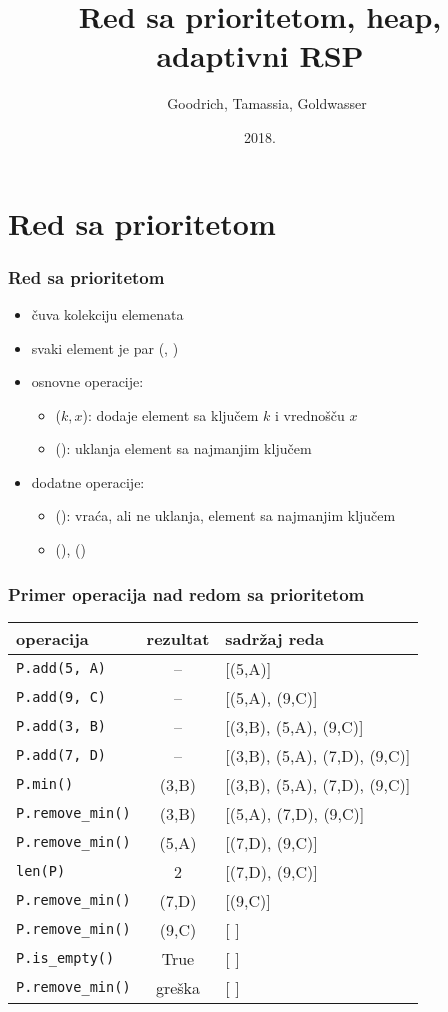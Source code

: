 \documentclass[compress]{beamer}
\title{Red sa prioritetom, heap, adaptivni RSP}
\author{\textcopyright \ \ Goodrich, Tamassia, Goldwasser}
\institute{Katedra za informatiku, Fakultet tehničkih nauka, Univerzitet u
Novom Sadu}
\date{2018.}
\begin{document}
\frame{\titlepage}

\section[Red sa prioritetom]{Red sa prioritetom}
\begin{frame}[fragile]
  \frametitle{Red sa prioritetom}
  \begin{itemize}
    \item {} čuva kolekciju elemenata 
    \item svaki element je par (, )
    \item osnovne operacije:
    \begin{itemize}
      \item {}($k, x$): dodaje element sa ključem $k$ i vrednošču $x$
      \item {}(): uklanja element sa najmanjim ključem 
    \end{itemize}
    \item dodatne operacije:
    \begin{itemize}
      \item {}(): vraća, ali ne uklanja, element sa najmanjim ključem
      \item {}(), () 
    \end{itemize}
  \end{itemize}
\end{frame}

\begin{frame}[fragile,shrink=10]
  \frametitle{Primer operacija nad redom sa prioritetom}
\begin{center}
\begin{tabular}{lcl}
\textbf{operacija} & \textbf{rezultat} & \textbf{sadržaj reda} \\
\hline \hline
\texttt{P.add(5, A)} & -- & [(5,A)] \\ 
\texttt{P.add(9, C)} & -- & [(5,A), (9,C)] \\ 
\texttt{P.add(3, B)} & -- & [(3,B), (5,A), (9,C)] \\ 
\texttt{P.add(7, D)} & -- & [(3,B), (5,A), (7,D), (9,C)] \\ 
\texttt{P.min()} & (3,B) & [(3,B), (5,A), (7,D), (9,C)] \\ 
\texttt{P.remove\_min()} & (3,B) & [(5,A), (7,D), (9,C)] \\ 
\texttt{P.remove\_min()} & (5,A) & [(7,D), (9,C)] \\ 
\texttt{len(P)} & 2 & [(7,D), (9,C)] \\
\texttt{P.remove\_min()} & (7,D) & [(9,C)] \\ 
\texttt{P.remove\_min()} & (9,C) & [ ] \\ 
\texttt{P.is\_empty()} & True & [ ] \\ 
\texttt{P.remove\_min()} & greška & [ ]
\end{tabular}
\end{center}
\end{frame}
\end{document}
